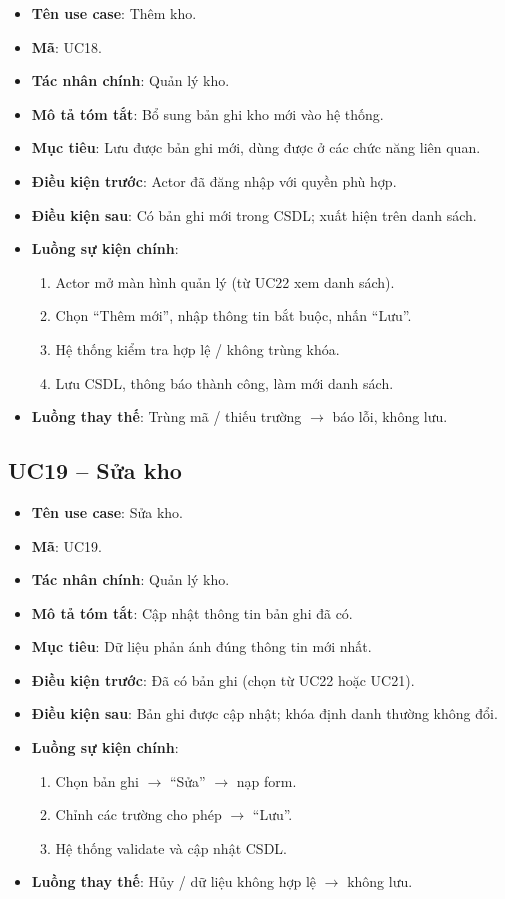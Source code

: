 \begin{itemize}[leftmargin=1.5cm]
    \item \textbf{Tên use case}: Thêm kho.
    \item \textbf{Mã}: UC18.
    \item \textbf{Tác nhân chính}: Quản lý kho.
    \item \textbf{Mô tả tóm tắt}: Bổ sung bản ghi kho mới vào hệ thống.
    \item \textbf{Mục tiêu}: Lưu được bản ghi mới, dùng được ở các chức năng liên quan.
    \item \textbf{Điều kiện trước}: Actor đã đăng nhập với quyền phù hợp.
    \item \textbf{Điều kiện sau}: Có bản ghi mới trong CSDL; xuất hiện trên danh sách.
    \item \textbf{Luồng sự kiện chính}:
    \begin{enumerate}
        \item Actor mở màn hình quản lý (từ UC22 xem danh sách).
        \item Chọn ``Thêm mới'', nhập thông tin bắt buộc, nhấn ``Lưu''.
        \item Hệ thống kiểm tra hợp lệ / không trùng khóa.
        \item Lưu CSDL, thông báo thành công, làm mới danh sách.
    \end{enumerate}
    \item \textbf{Luồng thay thế}: Trùng mã / thiếu trường $\rightarrow$ báo lỗi, không lưu.
\end{itemize}


\subsection{UC19 -- Sửa kho}

\begin{itemize}[leftmargin=1.5cm]
    \item \textbf{Tên use case}: Sửa kho.
    \item \textbf{Mã}: UC19.
    \item \textbf{Tác nhân chính}: Quản lý kho.
    \item \textbf{Mô tả tóm tắt}: Cập nhật thông tin bản ghi đã có.
    \item \textbf{Mục tiêu}: Dữ liệu phản ánh đúng thông tin mới nhất.
    \item \textbf{Điều kiện trước}: Đã có bản ghi (chọn từ UC22 hoặc UC21). 
    \item \textbf{Điều kiện sau}: Bản ghi được cập nhật; khóa định danh thường không đổi.
    \item \textbf{Luồng sự kiện chính}:
    \begin{enumerate}
        \item Chọn bản ghi $\rightarrow$ ``Sửa'' $\rightarrow$ nạp form.
        \item Chỉnh các trường cho phép $\rightarrow$ ``Lưu''.
        \item Hệ thống validate và cập nhật CSDL.
    \end{enumerate}
    \item \textbf{Luồng thay thế}: Hủy / dữ liệu không hợp lệ $\rightarrow$ không lưu.
\end{itemize}


